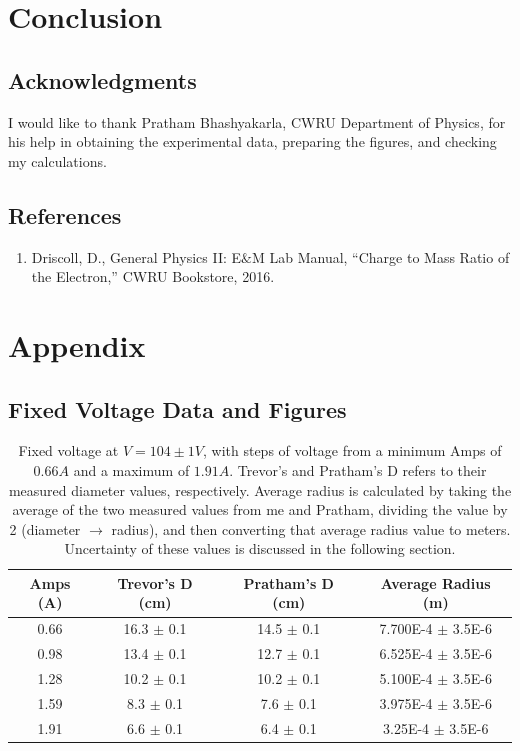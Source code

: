 \documentclass[12pt]{article}
\begin{document}
\section{Conclusion}
\lipsum[6]

\subsection{Acknowledgments}
I would like to thank Pratham Bhashyakarla, CWRU Department of Physics, for his help in obtaining the experimental data, preparing the figures, and checking my calculations.

\subsection{References}
\begin{enumerate}
    \item Driscoll, D., General Physics II: E$\&$M Lab Manual, “Charge to Mass Ratio of the Electron,” CWRU Bookstore, 2016.
    \label{ref:MANUEL}
\end{enumerate}

\clearpage
\appendix
\section{Appendix}
\subsection{Fixed Voltage Data and Figures}

\begin{table}[h]
    \centering
    \begin{tabular}{|c|c|c|c|}
        \hline
        Amps (A) & Trevor's D (cm) & Pratham's D (cm) & Average Radius (m) \\ 
        \hline
        0.66 & 16.3 $\pm$ 0.1 & 14.5 $\pm$ 0.1 & 7.700E-4 $\pm$ 3.5E-6 \\ 
        0.98 & 13.4 $\pm$ 0.1 & 12.7 $\pm$ 0.1 & 6.525E-4 $\pm$ 3.5E-6 \\ 
        1.28 & 10.2 $\pm$ 0.1 & 10.2 $\pm$ 0.1 & 5.100E-4 $\pm$ 3.5E-6 \\ 
        1.59 & 8.3 $\pm$ 0.1 & 7.6 $\pm$ 0.1 & 3.975E-4 $\pm$ 3.5E-6 \\
        1.91 & 6.6 $\pm$ 0.1 & 6.4 $\pm$ 0.1 & 3.25E-4 $\pm$ 3.5E-6 \\
        \hline
    \end{tabular}
    \caption{Fixed voltage at $V=104\pm1 V$, with steps of voltage from a minimum Amps of $0.66 A$ and a maximum of $1.91 A$. Trevor's and Pratham's D refers to their measured diameter values, respectively. Average radius is calculated by taking the average of the two measured values from me and Pratham, dividing the value by 2 (diameter $\to$ radius), and then converting that average radius value to meters. Uncertainty of these values is discussed in the following section.}
    \label{t:FixV}
\end{table}
\end{document}
